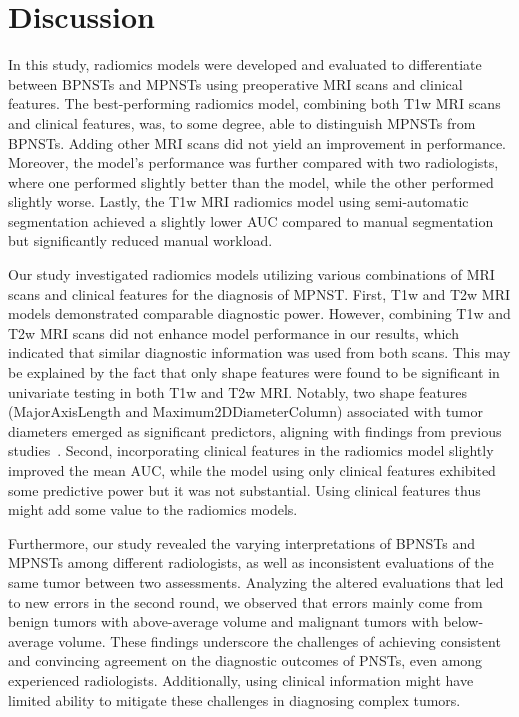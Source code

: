 \section{Discussion}
In this study, radiomics models were developed and evaluated to differentiate between BPNSTs and MPNSTs using preoperative MRI scans and clinical features.
The best-performing radiomics model, combining both T1w MRI scans and clinical features, was, to some degree, able to distinguish MPNSTs from BPNSTs.
Adding other MRI scans did not yield an improvement in performance.
Moreover, the model's performance was further compared with two radiologists, where one performed slightly better than the model, while the other performed slightly worse.
Lastly, the T1w MRI radiomics model using semi-automatic segmentation achieved a slightly lower AUC compared to manual segmentation but significantly reduced manual workload.

Our study investigated radiomics models utilizing various combinations of MRI scans and clinical features for the diagnosis of MPNST.
First, T1w and T2w MRI models demonstrated comparable diagnostic power.
However, combining T1w and T2w MRI scans did not enhance model performance in our results, which indicated that similar diagnostic information was used from both scans.
This may be explained by the fact that only shape features were found to be significant in univariate testing in both T1w and T2w MRI.
Notably, two shape features (MajorAxisLength and Maximum2DDiameterColumn) associated with tumor diameters emerged as significant predictors, aligning with findings from previous studies~\autocite{zhang2021,demehri2014}.
Second, incorporating clinical features in the radiomics model slightly improved the mean AUC, while the model using only clinical features exhibited some predictive power but it was not substantial.
Using clinical features thus might add some value to the radiomics models.

Furthermore, our study revealed the varying interpretations of BPNSTs and MPNSTs among different radiologists, as well as inconsistent evaluations of the same tumor between two assessments.
Analyzing the altered evaluations that led to new errors in the second round, we observed that errors mainly come from benign tumors with above-average volume and malignant tumors with below-average volume.
These findings underscore the challenges of achieving consistent and convincing agreement on the diagnostic outcomes of PNSTs, even among experienced radiologists.
Additionally, using clinical information might have limited ability to mitigate these challenges in diagnosing complex tumors.

